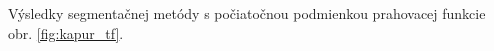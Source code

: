 \documentclass[a4paper,11pt,oneside]{article}%
\begin{document}
Výsledky segmentačnej metódy s počiatočnou podmienkou prahovacej funkcie obr. \ref{fig:kapur_tf}.

\begin{figure}[H]  
    \hspace{5px}

\end{figure}
\end{document}
